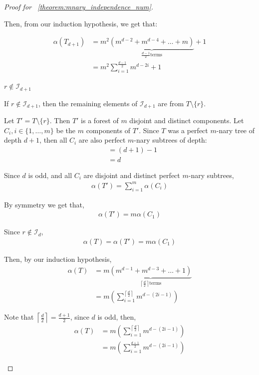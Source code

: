 \documentclass{amsart}
\theoremstyle{definition}
\begin{document}
\begin{proof}[Proof for ~\ref{theorem:mnary_independence_num}]
\begin{caseof}
\begin{subcaseof}
			Then, from our induction hypothesis, we get that:

			\begin{align}
				\alpha(T_{d+1}) & = m^2\underbrace{(m^{d - 2} + m^{d - 4} + \ldots + m)}_{\frac{d-1}{2} \text{terms}} + 1                           \nonumber \\
				                & = m^2\displaystyle\sum_{i = 1}^{\frac{d-1}{2}}m^{d - 2i} + 1
				\label{eq:mnary_odd_case}
			\end{align}


			\item $r \not\in \mathcal{I}_{d + 1}$

			If $r \not\in \mathcal{I}_{d + 1}$, then the remaining elements of $\mathcal{I}_{d + 1}$ are from $T \setminus \{r\}$.

			Let $T' = T\setminus\{r\}$. Then $T'$ is a forest of $m$ disjoint and distinct components. Let $C_i, i \in \{1, \dots, m\}$ be the $m$ components of $T'$. Since $T$ was a perfect $m$-nary tree of depth $d + 1$, then all $C_i$ are also perfect $m$-nary subtrees of depth:
			\begin{align*}
				 & = (d + 1) - 1 \\
				 & = d
			\end{align*}

			Since $d$ is odd, and all $C_i$ are disjoint and distinct perfect $m$-nary subtrees,
			\begin{align*}
				\alpha(T') = \displaystyle\sum_{i = 1}^{m}\alpha(C_i)
			\end{align*}

			By symmetry we get that,
			\begin{align*}
				\alpha(T') = m \alpha(C_1)
			\end{align*}

			Since $r \not\in \mathcal{I}_d$,
			\begin{align*}
				\alpha(T) = \alpha(T') = m \alpha(C_1)
			\end{align*}

			Then, by our induction hypothesis,
			\begin{align}
				\alpha(T) & = m\underbrace{(m^{d - 1} + m^{d - 3} + \dots + 1)}_{\left\lceil\frac{d}{2}\right\rceil \text{terms}}          \nonumber \\
				          & = m\left(\displaystyle\sum_{i = 1}^{\left\lceil\frac{d}{2}\right\rceil}m^{d - (2i - 1)}\right) \nonumber
			\end{align}

			Note that $\left\lceil\frac{d}{2}\right\rceil = \frac{d + 1}{2}$, since $d$ is odd, then,
			\begin{align}
				\alpha(T) & = m\left(\displaystyle\sum_{i = 1}^{\left\lceil\frac{d}{2}\right\rceil}m^{d - (2i - 1)}\right) \nonumber \\
				          & = m\left(\displaystyle\sum_{i = 1}^{\frac{d + 1}{2}}m^{d - (2i - 1)}\right)  \label{eq:mnary_even_case}
			\end{align}



\end{subcaseof}
\end{caseof}
\end{proof}
\end{document}
